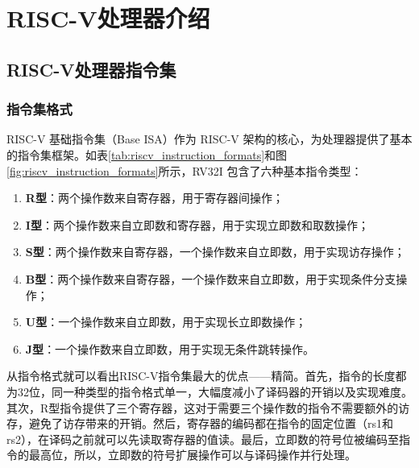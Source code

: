 
\chapter{RISC-V处理器介绍}

\section{RISC-V处理器指令集}

\subsection{指令集格式}

RISC-V 基础指令集（Base ISA）作为 RISC-V 架构的核心，为处理器提供了基本的指令集框架。如表\ref{tab:riscv_instruction_formats}和图\ref{fig:riscv_instruction_formats}所示，RV32I 包含了六种基本指令类型：
\begin{enumerate}[]
	\item \textbf{R型}：两个操作数来自寄存器，用于寄存器间操作；
	\item \textbf{I型}：两个操作数来自立即数和寄存器，用于实现立即数和取数操作；
	\item \textbf{S型}：两个操作数来自寄存器，一个操作数来自立即数，用于实现访存操作；
	\item \textbf{B型}：两个操作数来自寄存器，一个操作数来自立即数，用于实现条件分支操作；
	\item \textbf{U型}：一个操作数来自立即数，用于实现长立即数操作；
	\item \textbf{J型}：一个操作数来自立即数，用于实现无条件跳转操作。
\end{enumerate}

从指令格式就可以看出RISC-V指令集最大的优点——精简。首先，指令的长度都为32位，同一种类型的指令格式单一，大幅度减小了译码器的开销以及实现难度。其次，R型指令提供了三个寄存器，这对于需要三个操作数的指令不需要额外的访存，避免了访存带来的开销。然后，寄存器的编码都在指令的固定位置（rs1和rs2），在译码之前就可以先读取寄存器的值读。最后，立即数的符号位被编码至指令的最高位，所以，立即数的符号扩展操作可以与译码操作并行处理。

